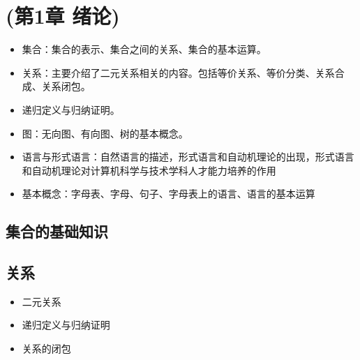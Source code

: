 \chapter{\cite{蒋宗礼2013}(第1章 绪论)}

\begin{itemize}
	\item 集合：集合的表示、集合之间的关系、集合的基本运算。
	\item 关系：主要介绍了二元关系相关的内容。包括等价关系、等价分类、关系合成、关系闭包。
	\item 递归定义与归纳证明。	
	\item 图：无向图、有向图、树的基本概念。
	\item 语言与形式语言：自然语言的描述，形式语言和自动机理论的出现，形式语言和自动机理论对计算机科学与技术学科人才能力培养的作用
	\item 基本概念：字母表、字母、句子、字母表上的语言、语言的基本运算
	
\end{itemize}

\section{集合的基础知识}

\section{关系}
\begin{itemize}
	\item 二元关系 
	\item 递归定义与归纳证明 
	\item 关系的闭包 
\end{itemize}

